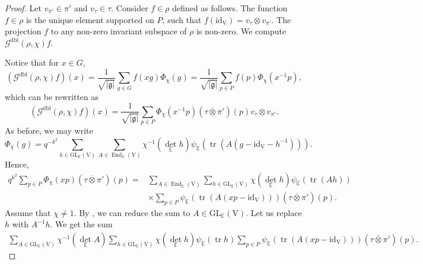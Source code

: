 \documentclass[12pt, reqno]{amsart}
\theoremstyle{definition}
\theoremstyle{definition}
\theoremstyle{definition}
\newcommand{\detQuadratic}{{\det}_{\quadraticExtension}}
\newcommand{\EndomorphismRing}{\operatorname{End}}
\newcommand{\idmap}{\mathrm{id}}
\newcommand{\sizeof}[1]{\left|#1\right|}
\newcommand{\hermitianSpace}{\mathrm{V}}
\newcommand{\fieldCharacter}{\psi}
\newcommand{\trace}{\operatorname{tr}}
\newcommand{\GL}{\mathrm{GL}}
\newcommand{\quadraticExtension}{\mathbb{E}}
\newcommand{\dblGaussSum}[2]{\mathcal{G}^{\mathrm{dbl}}\left(#1, #2\right)}
\newcommand{\lieAlgebra}{\mathfrak{g}}
\begin{document}
\begin{proof}
	Let $v_{\pi'} \in \pi'$ and $v_{\tau} \in \tau$. Consider $f \in \rho$ defined as follows. The function $f \in \rho$ is the unique element supported on $P$, such that $f\left(\idmap_{\hermitianSpace}\right) = v_{\tau} \otimes v_{\pi'}$. The projection $f$ to any non-zero invariant subspace of $\rho$ is non-zero. We compute $\dblGaussSum{\rho}{\chi} f$.
	
	Notice that for $x \in G$, $$\left(\dblGaussSum{\rho}{\chi} f\right)\left(x\right) = \frac{1}{\sqrt{\sizeof{\lieAlgebra}}} \sum_{g \in G} f\left(xg\right) \Phi_{\chi}\left(g\right) = \frac{1}{\sqrt{\sizeof{\lieAlgebra}}} \sum_{p \in P} f\left(p\right) \Phi_{\chi}\left(x^{-1} p\right),$$
	which can be rewritten as
	$$\left(\dblGaussSum{\rho}{\chi} f\right)\left(x\right) = \frac{1}{\sqrt{\sizeof{\lieAlgebra}}} \sum_{p \in P}  \Phi_{\chi}\left(x^{-1} p\right) \left(\tau \overline{\otimes} \pi'\right)\left(p\right) v_\tau \otimes v_{\pi'}.$$
	As before, we may write
	$$\Phi_{\chi}\left(g\right) = q^{-k^2} \sum_{h \in \GL_{\quadraticExtension}\left(\hermitianSpace\right)} \sum_{A \in \EndomorphismRing_{\quadraticExtension}\left(\hermitianSpace\right)} \chi^{-1}\left(\detQuadratic h\right) \fieldCharacter_{\quadraticExtension}\left(\trace\left(A \left(g - \idmap_{\hermitianSpace} - h^{-1}\right)\right)\right).$$
	Hence, \begin{align*}
		q^{k^2} \sum_{p \in P} \Phi_{\chi}\left(xp\right) \left(\tau \overline{\otimes} \pi'\right)\left(p\right) =& \sum_{A \in \EndomorphismRing_{\quadraticExtension}\left(\hermitianSpace\right)} \sum_{h \in \GL_{\quadraticExtension}\left(\hermitianSpace\right)} \chi\left(\detQuadratic h\right)\fieldCharacter_{\quadraticExtension}\left(\trace\left(Ah\right)\right) \\
		& \times \sum_{p \in P} \fieldCharacter_{\quadraticExtension}\left(\trace\left(A \left(xp - \idmap_{\hermitianSpace}\right)\right)\right) \left(\tau \overline{\otimes} \pi'\right)\left(p\right).
	\end{align*}
	Assume that $\chi \ne 1$. By , we can reduce the sum to $A \in \GL_{\quadraticExtension}\left(\hermitianSpace\right)$. Let us replace $h$ with $A^{-1} h$. We get the sum
	\begin{align*}
		\sum_{A \in \GL_{\quadraticExtension}\left(\hermitianSpace\right)} \chi^{-1}\left(\detQuadratic A\right) \sum_{h \in \GL_{\quadraticExtension}\left(\hermitianSpace\right)} \chi\left(\detQuadratic h\right)\fieldCharacter_{\quadraticExtension}\left(\trace h\right) \sum_{p \in P} \fieldCharacter_{\quadraticExtension}\left(\trace\left(A \left(xp - \idmap_{\hermitianSpace}\right)\right)\right) \left(\tau \overline{\otimes} \pi'\right)\left(p\right).

\end{align*}
\end{proof}
\end{document}
